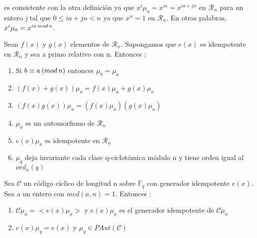 es consistente con la otra definición ya que $x^i\mu_a = x^{ia} = x^{ia + jn}$ en $\mathcal{R}_n$ para un entero \textit{j} tal que $ 0 \leq ia + jn < n$ ya que $x^n = 1 $ en $\mathcal{R}_n$. En otras palabras, $x^i\mu_a = x^{ia \thinspace mod \thinspace n}$.


\begin{theorem}
\label{th:propiedades de multiplicadores}
Sean $f(x)$ y $g(x)$ elementos de $\mathcal{R}_n$. Supongamos que $e(x)$ es idempotente en $\mathcal{R}_n$ y sea a primo relativo con n. Entonces : 
\begin{enumerate}
	\item Si $ b \equiv a \thinspace (mod \thinspace n)$ entonces $\mu_b = \mu_a$
	\item $(f(x) + g(x))\mu_a = f(x)\mu_a + g(x)\mu_a$
	\item $(f(x)g(x))\mu_a = (f(x)\mu_a)(g(x)\mu_a)$
	\item $\mu_a$ es un automorfismo de $\mathcal{R}_n$
	\item $e(x)\mu_a$ es idempotente en $\mathcal{R}_n$
	\item $\mu_q$ deja invariante cada clase q-ciclotómica módulo n y tiene orden igual al $ord_n(q)$
\end{enumerate}
\end{theorem}


\begin{theorem}
Sea $\mathcal{C}$ un código cíclico de longitud n sobre $\mathbb{F}_q$ con generador idempotente $e(x)$. Sea a un entero con $mcd(a,n) = 1$. Entonces :
\begin{enumerate}
	\item $\mathcal{C}\mu_a = <e(x)\mu_a>$ y $e(x)\mu_a$ es el generador idempotente de $\mathcal{C}\mu_a$
	\item $ e(x)\mu_q = e(x)$ y $\mu_q \in PAut(\mathcal{C})$
\end{enumerate}
\end{theorem}


